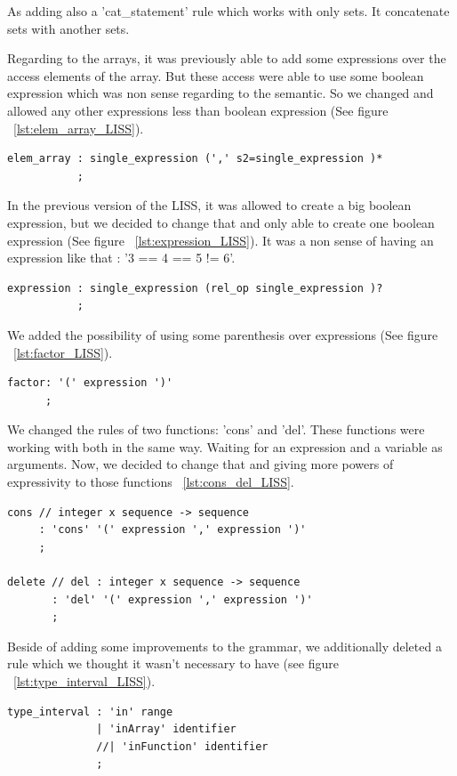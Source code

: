\documentclass[
  oneside,
  11pt, a4paper,
  footinclude=true,
  headinclude=true,
  cleardoublepage=empty
]{scrbook}
\begin{document}
As adding also a 'cat\_statement' rule which works with only sets. It concatenate sets with another sets.

Regarding to the arrays, it was previously able to add some expressions over the access elements of the array. But these access were able to use some boolean expression which was non sense regarding to the semantic. So we changed and allowed any other expressions less than boolean expression (See figure ~\ref{lst:elem_array_LISS}).


\begin{lstlisting}[caption={Rule element of array},label={lst:elem_array_LISS}]
elem_array : single_expression (',' s2=single_expression )*
           ;
\end{lstlisting}

In the previous version of the LISS, it was allowed to create a big boolean expression, but we decided to change that and only able to create one boolean expression (See figure ~\ref{lst:expression_LISS}).
It was a non sense of having an expression like that : '3 == 4 == 5 != 6'.
\begin{lstlisting}[caption={Rule expression},label={lst:expression_LISS}]
expression : single_expression (rel_op single_expression )?
           ;
\end{lstlisting}

We added the possibility of using some parenthesis over expressions (See figure ~\ref{lst:factor_LISS}).

\begin{lstlisting}[caption={Rule factor},label={lst:factor_LISS}]
factor: '(' expression ')'
      ;
\end{lstlisting}

We changed the rules of two functions: 'cons' and 'del'. These functions were working with both in the same way. Waiting for an expression and a variable as arguments. Now, we decided to change that and giving more powers of expressivity to those functions ~\ref{lst:cons_del_LISS}.

\begin{lstlisting}[caption={Rule cons and delete},label={lst:cons_del_LISS}]
cons // integer x sequence -> sequence
     : 'cons' '(' expression ',' expression ')'
     ;

delete // del : integer x sequence -> sequence
       : 'del' '(' expression ',' expression ')'
       ;
\end{lstlisting}

Beside of adding some improvements to the grammar, we additionally deleted a rule which we thought it wasn't necessary to have (see figure ~\ref{lst:type_interval_LISS}).
\begin{lstlisting}[caption={Rule type interval},label={lst:type_interval_LISS}]
type_interval : 'in' range
              | 'inArray' identifier
              //| 'inFunction' identifier
              ;
\end{lstlisting}
\end{document}
